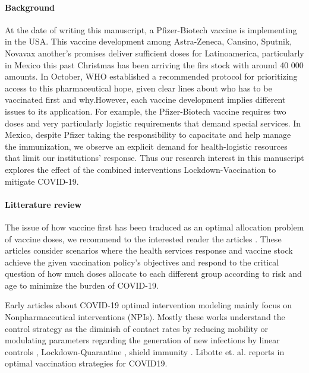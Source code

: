 \paragraph{Background}
         At the date of writing this manuscript, a Pfizer-Biotech vaccine is
    implementing in the USA. This vaccine development among Astra-Zeneca,
    Cansino, Sputnik, Novavax another's promises deliver sufficient doses
    for Latinoamerica, particularly in Mexico this past Christmas has been
    arriving the firs stock with around 40 000 amounts. In October, WHO
    established a recommended protocol for prioritizing access to this
    pharmaceutical hope, given clear lines about who has to be vaccinated first
    and why.However, each vaccine development implies different issues to its
    application. For example, the Pfizer-Biotech vaccine requires two doses and
    very particularly logistic requirements that demand special services. In
    Mexico, despite Pfizer taking the responsibility to capacitate and help
    manage the immunization, we observe an explicit demand for health-logistic
    resources that limit our institutions' response. Thus our research interest
    in this manuscript explores the effect of the combined interventions
    Lockdown-Vaccination to mitigate COVID-19.


\paragraph{Litterature review}
        The issue of how vaccine first has been traduced as an optimal
    allocation problem of vaccine doses, we recommend to the interested reader
    the articles \cite{Bubar2020,Matrajt2020}.  These articles
    consider scenarios where the health services response and vaccine stock
    achieve the given vaccination policy's objectives and respond to the
    critical question of how much doses allocate to each different group
    according to risk and age to minimize the burden of COVID-19.

        Early articles about COVID-19 optimal intervention modeling mainly
    focus on Nonpharmaceutical interventions (NPIs). Mostly these works
    understand the control strategy as the diminish of contact rates by
    reducing mobility or modulating parameters regarding the generation of new
    infections by linear controls \cite{Naraigh2020,Ullah2020},
    Lockdown-Quarantine \cite{Mandal2020},  shield immunity
    \cite{Weitz2020}. Libotte et. al. reports in \cite{Libotte2020} optimal
    vaccination strategies for COVID19.
